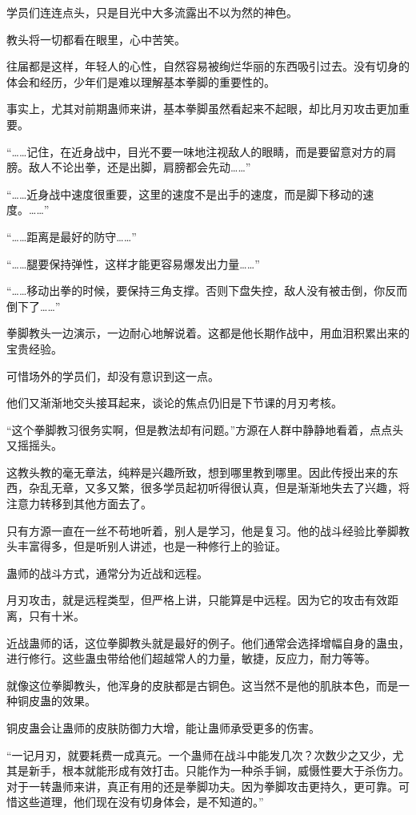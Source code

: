 \begin{this_body}
学员们连连点头，只是目光中大多流露出不以为然的神色。

教头将一切都看在眼里，心中苦笑。

往届都是这样，年轻人的心性，自然容易被绚烂华丽的东西吸引过去。没有切身的体会和经历，少年们是难以理解基本拳脚的重要性的。

事实上，尤其对前期蛊师来讲，基本拳脚虽然看起来不起眼，却比月刃攻击更加重要。

“……记住，在近身战中，目光不要一味地注视敌人的眼睛，而是要留意对方的肩膀。敌人不论出拳，还是出脚，肩膀都会先动……”

“……近身战中速度很重要，这里的速度不是出手的速度，而是脚下移动的速度。……”

“……距离是最好的防守……”

“……腿要保持弹性，这样才能更容易爆发出力量……”

“……移动出拳的时候，要保持三角支撑。否则下盘失控，敌人没有被击倒，你反而倒下了……”

拳脚教头一边演示，一边耐心地解说着。这都是他长期作战中，用血泪积累出来的宝贵经验。

可惜场外的学员们，却没有意识到这一点。

他们又渐渐地交头接耳起来，谈论的焦点仍旧是下节课的月刃考核。

“这个拳脚教习很务实啊，但是教法却有问题。”方源在人群中静静地看着，点点头又摇摇头。

这教头教的毫无章法，纯粹是兴趣所致，想到哪里教到哪里。因此传授出来的东西，杂乱无章，又多又繁，很多学员起初听得很认真，但是渐渐地失去了兴趣，将注意力转移到其他方面去了。

只有方源一直在一丝不苟地听着，别人是学习，他是复习。他的战斗经验比拳脚教头丰富得多，但是听别人讲述，也是一种修行上的验证。

蛊师的战斗方式，通常分为近战和远程。

月刃攻击，就是远程类型，但严格上讲，只能算是中远程。因为它的攻击有效距离，只有十米。

近战蛊师的话，这位拳脚教头就是最好的例子。他们通常会选择增幅自身的蛊虫，进行修行。这些蛊虫带给他们超越常人的力量，敏捷，反应力，耐力等等。

就像这位拳脚教头，他浑身的皮肤都是古铜色。这当然不是他的肌肤本色，而是一种铜皮蛊的效果。

铜皮蛊会让蛊师的皮肤防御力大增，能让蛊师承受更多的伤害。

“一记月刃，就要耗费一成真元。一个蛊师在战斗中能发几次？次数少之又少，尤其是新手，根本就能形成有效打击。只能作为一种杀手锏，威慑性要大于杀伤力。对于一转蛊师来讲，真正有用的还是拳脚功夫。因为拳脚攻击更持久，更可靠。可惜这些道理，他们现在没有切身体会，是不知道的。”


\end{this_body}
